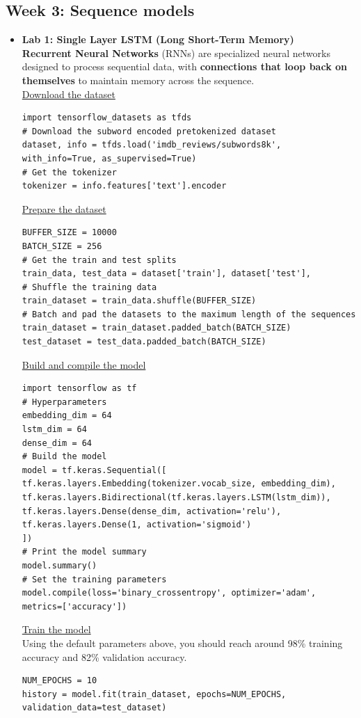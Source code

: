 \documentclass[20pt]{article}
\begin{document}
	\subsection{Week 3: Sequence models}
	\begin{itemize}
		\item \textbf{Lab 1: Single Layer LSTM (Long Short-Term Memory)}\\
		\textbf{Recurrent Neural Networks} (RNNs) are specialized neural networks designed to process sequential data, with \textbf{connections that loop back on themselves} to maintain memory across the sequence.\\
		\underline{Download the dataset}
		\begin{verbatim}
import tensorflow_datasets as tfds
# Download the subword encoded pretokenized dataset
dataset, info = tfds.load('imdb_reviews/subwords8k', with_info=True, as_supervised=True)
# Get the tokenizer
tokenizer = info.features['text'].encoder
		\end{verbatim}
		\underline{Prepare the dataset}
		\begin{verbatim}
BUFFER_SIZE = 10000
BATCH_SIZE = 256
# Get the train and test splits
train_data, test_data = dataset['train'], dataset['test'], 
# Shuffle the training data
train_dataset = train_data.shuffle(BUFFER_SIZE)
# Batch and pad the datasets to the maximum length of the sequences
train_dataset = train_dataset.padded_batch(BATCH_SIZE)
test_dataset = test_data.padded_batch(BATCH_SIZE)
		\end{verbatim}
		\underline{Build and compile the model}
		\begin{verbatim}
import tensorflow as tf
# Hyperparameters
embedding_dim = 64
lstm_dim = 64
dense_dim = 64
# Build the model
model = tf.keras.Sequential([
tf.keras.layers.Embedding(tokenizer.vocab_size, embedding_dim),
tf.keras.layers.Bidirectional(tf.keras.layers.LSTM(lstm_dim)),
tf.keras.layers.Dense(dense_dim, activation='relu'),
tf.keras.layers.Dense(1, activation='sigmoid')
])
# Print the model summary
model.summary()
# Set the training parameters
model.compile(loss='binary_crossentropy', optimizer='adam', metrics=['accuracy'])
		\end{verbatim}
		\underline{Train the model}\\
		Using the default parameters above, you should reach around 98\% training accuracy and 82\% validation accuracy. 
		\begin{verbatim}
NUM_EPOCHS = 10
history = model.fit(train_dataset, epochs=NUM_EPOCHS, validation_data=test_dataset)


\end{verbatim}
\end{itemize}
\end{document}
